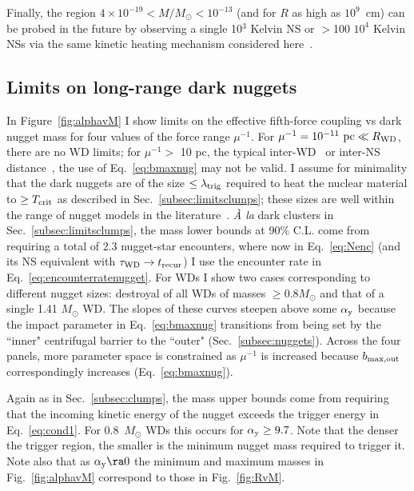 \documentclass[
    twocolumn,
	prd,
        amssymb,
	preprintnumbers,
	secnumarabic,
	nofootinbib,
	superscriptaddress]{revtex4-1}
\begin{document}
Finally, the region $4 \times 10^{-19} < M/M_\odot < 10^{-13}$ (and for $R$ as high as $10^9$~cm) can be probed in the future by observing a single 10$^3$ Kelvin NS or $>$100 $10^4$ Kelvin NSs via the same kinetic heating mechanism considered here~\cite{NSvIR:clumps2021}.

\subsection{Limits on long-range dark nuggets}
\label{subsec:limitsnuggets}

In Figure~\ref{fig:alphavM} I show limits on the effective fifth-force coupling vs dark nugget mass for four values of the force range $\mu^{-1}$.
For $\mu^{-1} = 10^{-11} \ {\rm pc} \ll R_{\rm WD}$, there are no WD limits; for $\mu^{-1} >$ 10 pc, the typical inter-WD~\cite{WDdistribs:Napiwotzki} or inter-NS distance~\cite{NSdistribs:BlaesMadau,NSdistribs:Sartore2010}, the use of Eq.~\eqref{eq:bmaxnug} may not be valid.   
I assume for minimality that the dark nuggets are of the size $\leq \lambda_{\rm trig}$ required to heat the nuclear material to $\geq T_{\rm crit}$ as described in Sec.~\ref{subsec:limitsclumps}; these sizes are well within the range of nugget models in the literature~\cite{BaiLongLunuggets:2018dxf,BlobsGrabowska:2018lnd,nuggetsGresham:2017cvl,GreshamLeeZurek:2022biw}.
{\em \`{A} la} dark clusters in Sec.~\ref{subsec:limitsclumps}, the mass lower bounds at 90\% C.L. come from requiring a total of 2.3 nugget-star encounters, where now in Eq.~\eqref{eq:Nenc} (and its NS equivalent with $\tau_{\rm WD} \to t_{\rm recur}$) I use the encounter rate in Eq.~\eqref{eq:encounterratenugget}.
For WDs I show two cases corresponding to different nugget sizes: destroyal of all WDs of masses $\geq 0.8 M_\odot$ and that of a single 1.41 $M_\odot$ WD.
The slopes of these curves steepen above some $\alpha_{\rm y}$ because the impact parameter in Eq.~\eqref{eq:bmaxnug} transitions from being set by the ``inner" centrifugal barrier to the ``outer" (Sec.~\ref{subsec:nuggets}).
Across the four panels, more parameter space is constrained as $\mu^{-1}$ is increased because $b_{\rm max, out}$ correspondingly increases (Eq.~\eqref{eq:bmaxnug}).

Again as in Sec.~\ref{subsec:clumps}, the mass upper bounds come from requiring that the incoming kinetic energy of the nugget exceeds the trigger energy in Eq.~\eqref{eq:cond1}.  
For 0.8~$M_\odot$ WDs this occurs for $\alpha_{\rm y} \geq 9.7$.
Note that the denser the trigger region, the smaller is the minimum nugget mass required to trigger it.
Note also that as $\alpha_{\rm y} \ra 0$ the minimum and maximum masses in Fig.~\ref{fig:alphavM} correspond to those in Fig.~\ref{fig:RvM}.
\end{document}
